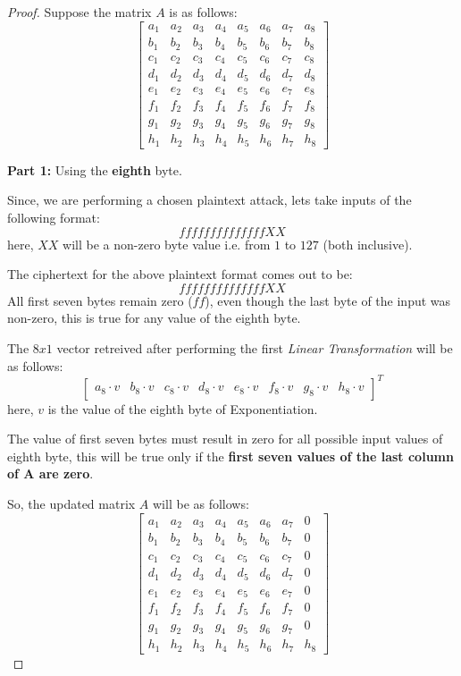 \documentclass[10pt,twoside]{article}
\begin{document}
\begin{proof}
  Suppose the matrix $A$ is as follows:
  $$\begin{bmatrix}
    a_1 & a_2 & a_3 & a_4 & a_5 & a_6 & a_7 & a_8\\
    b_1 & b_2 & b_3 & b_4 & b_5 & b_6 & b_7 & b_8\\
    c_1 & c_2 & c_3 & c_4 & c_5 & c_6 & c_7 & c_8\\
    d_1 & d_2 & d_3 & d_4 & d_5 & d_6 & d_7 & d_8\\
    e_1 & e_2 & e_3 & e_4 & e_5 & e_6 & e_7 & e_8\\
    f_1 & f_2 & f_3 & f_4 & f_5 & f_6 & f_7 & f_8\\
    g_1 & g_2 & g_3 & g_4 & g_5 & g_6 & g_7 & g_8\\
    h_1 & h_2 & h_3 & h_4 & h_5 & h_6 & h_7 & h_8
  \end{bmatrix}$$

  \textbf{Part 1:} Using the \textbf{eighth} byte. \newline

  Since, we are performing a chosen plaintext attack, lets take inputs of the following format:
  $$ffffffffffffffXX$$
  here, $XX$ will be a non-zero byte value i.e. from $1$ to $127$ (both inclusive). \newline

  The ciphertext for the above plaintext format comes out to be:
  $$ffffffffffffffXX$$
  All first seven bytes remain zero ($ff$), even though the last byte of the input was non-zero, this is true for any value of the eighth byte. \newline

  The $8x1$ vector retreived after performing the first \textit{Linear Transformation} will be as follows:
  $$\begin{bmatrix}
    a_8\cdot v & b_8\cdot v & c_8\cdot v & d_8\cdot v & e_8\cdot v & f_8\cdot v & g_8\cdot v & h_8\cdot v
  \end{bmatrix}^T$$
  here, $v$ is the value of the eighth byte of Exponentiation. \newline

  The value of first seven bytes must result in zero for all possible input values of eighth byte, this will be true only if the \textbf{first seven values of the last column of A are zero}. \newline

  So, the updated matrix $A$ will be as follows:
  $$\begin{bmatrix}
    a_1 & a_2 & a_3 & a_4 & a_5 & a_6 & a_7 & 0\\
    b_1 & b_2 & b_3 & b_4 & b_5 & b_6 & b_7 & 0\\
    c_1 & c_2 & c_3 & c_4 & c_5 & c_6 & c_7 & 0\\
    d_1 & d_2 & d_3 & d_4 & d_5 & d_6 & d_7 & 0\\
    e_1 & e_2 & e_3 & e_4 & e_5 & e_6 & e_7 & 0\\
    f_1 & f_2 & f_3 & f_4 & f_5 & f_6 & f_7 & 0\\
    g_1 & g_2 & g_3 & g_4 & g_5 & g_6 & g_7 & 0\\
    h_1 & h_2 & h_3 & h_4 & h_5 & h_6 & h_7 & h_8
  \end{bmatrix}$$


\end{proof}
\end{document}

